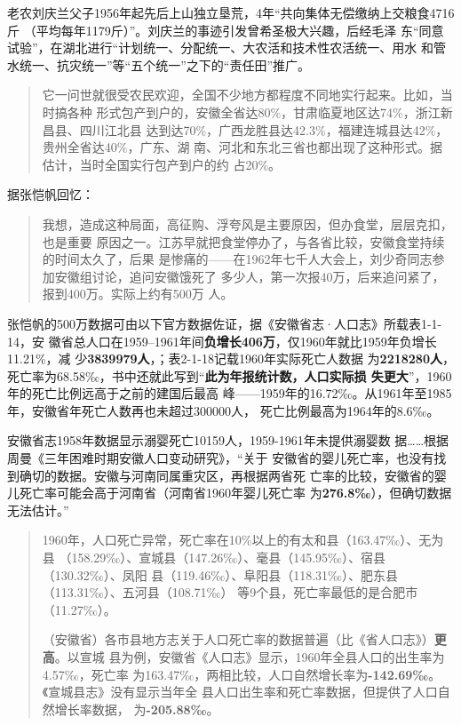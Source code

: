 老农刘庆兰父子1956年起先后上山独立垦荒，4年“共向集体无偿缴纳上交粮食4716斤
（平均每年1179斤）”。\cite{anhuiliushi}刘庆兰的事迹引发曾希圣极大兴趣，后经毛泽
东“同意试验”，在湖北进行“计划统一、分配统一、大农活和技术性农活统一、用水
和管水统一、抗灾统一”等“五个统一”之下的“责任田”推广。

\begin{quotation}
  它一问世就很受农民欢迎，全国不少地方都程度不同地实行起来。比如，当时搞各种
  形式包产到户的，安徽全省达80\%，甘肃临夏地区达74\%，浙江新昌县、四川江北县
  达到达70\%，广西龙胜县达42.3\%，福建连城县达42\%，贵州全省达40\%，广东、湖
  南、河北和东北三省也都出现了这种形式。据估计，当时全国实行包产到户的约
  占20\%。\cite[1078]{boyibo}
\end{quotation}

据张恺帆回忆：
\begin{quotation}
  我想，造成这种局面，高征购、浮夸风是主要原因，但办食堂，层层克扣，也是重要
  原因之一。江苏早就把食堂停办了，与各省比较，安徽食堂持续的时间太久了，后果
  是惨痛的——在1962年七千人大会上，刘少奇同志参加安徽组讨论，追问安徽饿死了
  多少人，第一次报40万，后来追问紧了，报到400万。实际上约有500万
  人。\cite[344]{zhangkaifanhuiyi}
\end{quotation}

张恺帆的500万数据可由以下官方数据佐证，据《安徽省志·人口志》所载表1-1-14，安
徽省总人口在1959--1961年间\textbf{负增长406万}，仅1960年就比1959年负增长11.21\%，减
少\textbf{3839979人}，\cite[27]{anhuishengzhi}；表2-1-18记载1960年实际死亡人数据
为\textbf{2218280人}，死亡率为68.58‰，书中还就此写到“\textbf{此为年报统计数，人口实际损
  失更大}”，1960年的死亡比例远高于之前的建国后最高
峰——1959年的16.72‰。从1961年至1985年，安徽省年死亡人数再也未超过300000人，
死亡比例最高为1964年的8.6‰。\cite[95-96]{anhuishengzhi}

安徽省志1958年数据显示溺婴死亡10159人，1959-1961年未提供溺婴数
据……\cite[108]{anhuishengzhi}根据周曼《三年困难时期安徽人口变动研究》，“关于
安徽省的婴儿死亡率，也没有找到确切的数据。安徽与河南同属重灾区，再根据两省死
亡率的比较，安徽省的婴儿死亡率可能会高于河南省（河南省1960年婴儿死亡率
为\textbf{276.8‰}），但确切数据无法估计。”

\begin{quotation}
  1960年，人口死亡异常，死亡率在10\%以上的有太和县（163.47‰）、无为县
  （158.29‰）、宣城县（147.26‰）、毫县（145.95‰）、宿县（130.32‰）、凤阳
  县（119.46‰）、阜阳县（118.31‰）、肥东县（113.31‰）、五河县（108.71‰）
  等9个县，死亡率最低的是合肥市（11.27‰）。\cite[98]{anhuishengzhi}

  （安徽省）各市县地方志关于人口死亡率的数据普遍（比《省人口志》）\textbf{更高}。以宣城
  县为例，安徽省《人口志》显示，1960年全县人口的出生率为4.57‰，死亡率
  为163.47‰，两相比较，人口自然增长率为\textbf{-142.69‰}。《宣城县志》没有显示当年全
  县人口出生率和死亡率数据，但提供了人口自然增长率数据，
  为\textbf{-205.88‰}。\cite{zaihuangchayixing}
\end{quotation}


